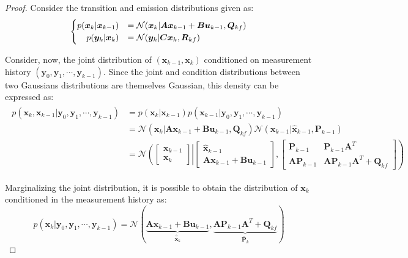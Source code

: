 \documentclass[a4paper,11pt]{book}
\numberwithin{figure}{chapter}
\numberwithin{equation}{chapter}
\numberwithin{table}{chapter}
\theoremstyle{definition}
\begin{document}
\begin{proof}
	Consider the transition and emission distributions given as:
	\begin{align}
	\begin{cases}
		p(\bm{x}_{k} | \bm{x}_{k-1}) &= \mathcal{N}(\bm{x}_k | \bm{A}\bm{x}_{k-1} + \bm{B}\bm{u}_{k-1}, \bm{Q}_{kf}) \\
		\hfill p(\bm{y}_{k} | \bm{x}_{k}) &= \mathcal{N}(\bm{y}_k | \bm{C}\bm{x}_{k}, \bm{R}_{kf})
	\end{cases}
	\end{align}
	
	Consider, now, the joint distribution of $\left( \bm{x}_{k-1}, \bm{x}_k \right)$ conditioned on measurement history $\left( \bm{y}_0, \bm{y}_1, \cdots, \bm{y}_{k-1} \right)$. Since the joint and condition distributions between two Gaussians distributions are themselves Gaussian, this density can be expressed as:
	\begin{align}
	\begin{split}
		p(\bm{x}_k, \bm{x}_{k-1} | \bm{y}_0, \bm{y}_1, \cdots, \bm{y}_{k-1}) &= p(\bm{x}_k | \bm{x}_{k-1}) p(\bm{x}_{k-1} | \bm{y}_0, \bm{y}_1, \cdots, \bm{y}_{k-1}) \\
		&= \mathcal{N}(\bm{x}_k | \bm{A}\bm{x}_{k-1}+\bm{B}\bm{u}_{k-1}, \bm{Q}_{kf}) \mathcal{N}(\bm{x}_{k-1} | \hat{\bm{x}}_{k-1}, \bm{P}_{k-1}) \\
		&= \mathcal{N}\left( \begin{bmatrix} \bm{x}_{k-1} \\ \bm{x}_{k} \end{bmatrix}	 \right| \left.	\begin{bmatrix} \hat{\bm{x}}_{k-1} \\ \bm{A}\bm{x}_{k-1}+\bm{B}\bm{u}_{k-1} \end{bmatrix}, \begin{bmatrix} \bm{P}_{k-1} & \bm{P}_{k-1} \bm{A}^T  \\ \bm{A} \bm{P}_{k-1} & \bm{A} \bm{P}_{k-1} \bm{A}^T + \bm{Q}_{kf} \end{bmatrix}	\right)
	\end{split}
	\end{align}
	
	Marginalizing the joint distribution, it is possible to obtain the distribution of $\bm{x}_k$ conditioned in the measurement history as:
	\begin{equation}
		p(\bm{x}_k | \bm{y}_0, \bm{y}_1, \cdots, \bm{y}_{k-1}) = \mathcal{N}( \underbrace{\bm{A} \bm{x}_{k-1} + \bm{B} \bm{u}_{k-1}}_{\hat{\bar{\bm{x}}}_k}, \underbrace{\bm{A} \bm{P}_{k-1} \bm{A}^T + \bm{Q}_{kf}}_{\bar{\bm{P}}_k} )
	\end{equation}
	

\end{proof}
\end{document}
